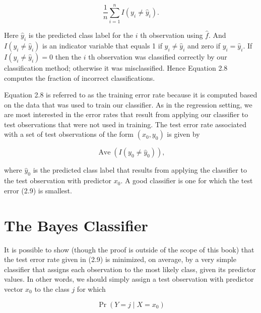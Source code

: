 \documentclass[10pt]{article}
\begin{document}
\begin{equation*}
\frac{1}{n} \sum_{i=1}^{n} I\left(y_{i} \neq \hat{y}_{i}\right) . \tag{2.8}
\end{equation*}


Here $\hat{y}_{i}$ is the predicted class label for the $i$ th observation using $\hat{f}$. And $I\left(y_{i} \neq \hat{y}_{i}\right)$ is an indicator variable that equals 1 if $y_{i} \neq \hat{y}_{i}$ and zero if $y_{i}=\hat{y}_{i}$. If $I\left(y_{i} \neq \hat{y}_{i}\right)=0$ then the $i$ th observation was classified correctly by our classification method; otherwise it was misclassified. Hence Equation 2.8 computes the fraction of incorrect classifications.

Equation 2.8 is referred to as the training error rate because it is computed based on the data that was used to train our classifier. As in the regression setting, we are most interested in the error rates that result from applying our classifier to test observations that were not used in training. The test error rate associated with a set of test observations of the form $\left(x_{0}, y_{0}\right)$ is given by


\begin{equation*}
\operatorname{Ave}\left(I\left(y_{0} \neq \hat{y}_{0}\right)\right), \tag{2.9}
\end{equation*}


where $\hat{y}_{0}$ is the predicted class label that results from applying the classifier to the test observation with predictor $x_{0}$. A good classifier is one for which the test error (2.9) is smallest.

\section*{The Bayes Classifier}
It is possible to show (though the proof is outside of the scope of this book) that the test error rate given in (2.9) is minimized, on average, by a very simple classifier that assigns each observation to the most likely class, given its predictor values. In other words, we should simply assign a test observation with predictor vector $x_{0}$ to the class $j$ for which


\begin{equation*}
\operatorname{Pr}\left(Y=j \mid X=x_{0}\right) \tag{2.10}
\end{equation*}
\end{document}
